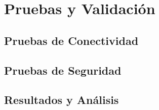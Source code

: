 
\chapter{Pruebas y Validación}\label{pruebas}

\section{Pruebas de Conectividad}

\section{Pruebas de Seguridad}

\section{Resultados y Análisis}
